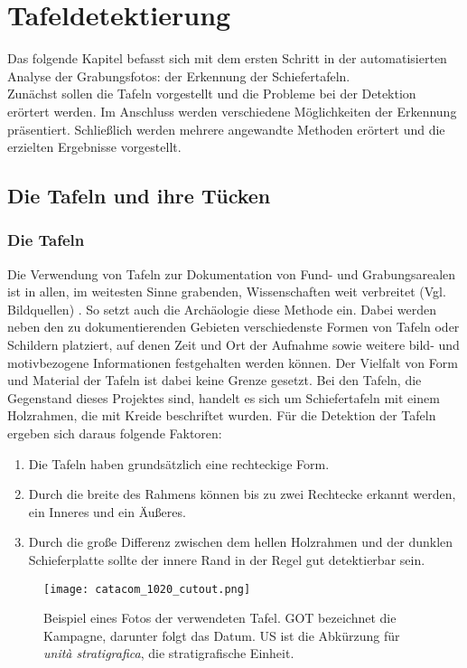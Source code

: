 \section{Tafeldetektierung}

Das folgende Kapitel befasst sich mit dem ersten Schritt in der automatisierten Analyse der Grabungsfotos: der Erkennung der Schiefertafeln.\\
Zunächst sollen die Tafeln vorgestellt und die Probleme bei der Detektion erörtert werden. Im Anschluss werden verschiedene Möglichkeiten der Erkennung präsentiert. Schließlich werden mehrere angewandte Methoden erörtert und die erzielten Ergebnisse vorgestellt.

\subsection{Die Tafeln und ihre Tücken}

\subsubsection{Die Tafeln}

Die Verwendung von Tafeln zur Dokumentation von Fund- und Grabungsarealen ist in allen, im weitesten Sinne grabenden, Wissenschaften weit verbreitet (Vgl. Bildquellen) . So setzt auch die Archäologie diese Methode ein. Dabei werden neben den zu dokumentierenden Gebieten verschiedenste Formen von Tafeln oder Schildern platziert, auf denen Zeit und Ort der Aufnahme sowie weitere bild- und motivbezogene Informationen festgehalten werden können. Der Vielfalt von Form und Material der Tafeln ist dabei keine Grenze gesetzt.
Bei den Tafeln, die Gegenstand dieses Projektes sind, handelt es sich um Schiefertafeln mit einem Holzrahmen, die mit Kreide beschriftet wurden. Für die Detektion der Tafeln ergeben sich daraus folgende Faktoren:\\
\begin{enumerate}
\item Die Tafeln haben grundsätzlich eine rechteckige Form.
\item Durch die breite des Rahmens können bis zu zwei Rechtecke erkannt werden, ein Inneres und ein Äußeres.
\item Durch die große Differenz zwischen dem hellen Holzrahmen und der dunklen Schieferplatte sollte der innere Rand in der Regel gut detektierbar sein.
\end{enumerate}
\begin{SCfigure}[0.5][h!]
\caption{Beispiel eines Fotos der verwendeten Tafel. GOT bezeichnet die Kampagne, darunter folgt das Datum. US ist die Abkürzung für \textit{unità stratigrafica}, die stratigrafische Einheit.}
\texttt{[image: catacom\_1020\_cutout.png]}
\end{SCfigure}

